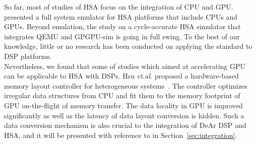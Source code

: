     So far, most of studies of HSA focus on the integration of CPU and GPU. 
    \cite{hsaemu} presented a full system emulator for HSA platforms that include CPUs and GPUs.
    Beyond emulation, the study on a cycle-accurate HSA simulator that integrates QEMU \cite{qemu} and GPGPU-sim \cite{gpgpusim} is going in full swing.
    To the best of our knowledge, little or no research has been conducted on applying the standard to DSP platforms.
    \\\indent
    Nevertheless, we found that some of studies which aimed at accelerating GPU can be applicable to HSA with DSPs.
    Hsu \textit{et.al.} proposed a hardware-based memory layout controller for heterogeneous systems~\cite{sc}.
    The controller optimizes irregular data structures from CPU and fit them to the memory footprint of GPU on-the-flight of memory transfer.
    The data locality in GPU is improved significantly as well as the latency of data layout conversion is hidden.
    Such a data conversion mechanism is also crucial to the integration of DeAr DSP and HSA, 
    and it will be presented with reference to \cite{sc} in Section~\ref{sec:integration}.

